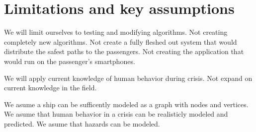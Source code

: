 \chapter{Limitations and key assumptions}
\label{ch:limitations}





We will limit ourselves to testing and modifying algorithms.
Not creating completely new algorithms.
Not create a fully fleshed out system that would distribute the
safest paths to the passengers.
Not creating the application that would run on the passenger's smartphones.

We will apply current knowledge of human behavior during crisis.
Not expand on current knowledge in the field.

We asume a ship can be sufficently modeled as a graph with nodes and vertices. 
We asume that human behavior in a crisis can be realisticly modeled and
predicted. We asume that hazards can be modeled.

